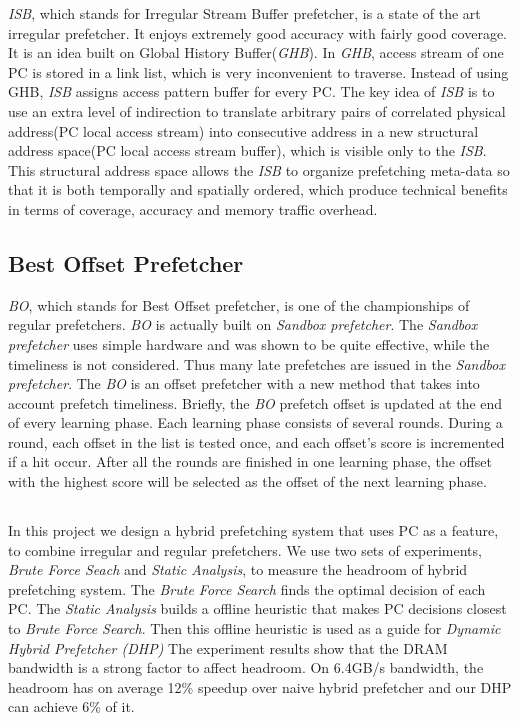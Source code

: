   \emph{ISB}, which stands for Irregular Stream Buffer prefetcher, is a state of the art irregular prefetcher. It enjoys extremely good accuracy with fairly good coverage. It is an idea built on Global History Buffer(\emph{GHB})\cite{ghbpaper}.
In \emph{GHB}, access stream of one PC is stored in a link list, which is very inconvenient to traverse. Instead of using GHB, \emph{ISB} assigns access pattern buffer for every PC.
The key idea of \emph{ISB} is to use an extra level of indirection to translate arbitrary pairs of correlated physical address(PC local access stream) into consecutive address in a new structural address space(PC local access stream buffer), which is visible only to the \emph{ISB}.
This structural address space allows the \emph{ISB} to organize prefetching meta-data so that it is both temporally and spatially ordered, which produce technical benefits in terms of coverage, accuracy and memory traffic overhead.

  \subsection{Best Offset Prefetcher}
  \label{sec:bointro}

  \emph{BO}, which stands for Best Offset prefetcher, is one of the championships of regular prefetchers. \emph{BO} is actually built on \emph{Sandbox prefetcher}\cite{sandboxpaper}.
 The \emph{Sandbox prefetcher} uses simple hardware and was shown to be quite effective, while the timeliness is not considered.
 Thus many late prefetches are issued in the \emph{Sandbox prefetcher}.
 The \emph{BO} is an offset prefetcher with a new method that takes into account prefetch timeliness. Briefly, the \emph{BO} prefetch offset is updated at the end of every learning phase. Each learning phase consists of several rounds.
 During a round, each offset in the list is tested once, and each offset's score is incremented if a hit occur.
 After all the rounds are finished in one learning phase, the offset with the highest score will be selected as the offset of the next learning phase.


 \subsection*{}
 In this project we design a hybrid prefetching system that uses PC as a feature, to combine irregular and regular prefetchers.
We use two sets of experiments, \emph{Brute Force Seach} and \emph{Static Analysis}, to measure the headroom of hybrid prefetching system. The \emph{Brute Force Search} finds the optimal decision of each PC.  
The \emph{Static Analysis} builds a offline heuristic that makes PC decisions closest to \emph{Brute Force Search}. 
Then this offline heuristic is used as a guide for \emph{Dynamic Hybrid Prefetcher (DHP)} 
The experiment results show that the DRAM bandwidth is a strong factor to affect headroom. On 6.4GB/s bandwidth, the headroom has on average 12\% speedup over naive hybrid prefetcher and our DHP can achieve 6\% of it. \par

